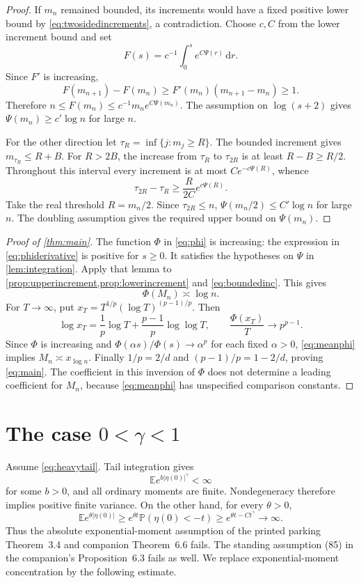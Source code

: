 \documentclass[11pt]{amsart}
\theoremstyle{remark}
\newcommand{\Pp}{\mathbb P}
\newcommand{\E}{\mathbb E}
\newcommand{\dd}{\,\mathrm d}
\begin{document}
\begin{proof}
If $m_n$ remained bounded, its increments would have a fixed positive
lower bound by \eqref{eq:twosidedincrements}, a contradiction.
Choose $c,C$ from the lower increment bound and set
\[
 F(s)=c^{-1}\int_0^s e^{C\Psi(r)}\dd r.
\]
Since $F'$ is increasing,
\[
 F(m_{n+1})-F(m_n)\ge F'(m_n)(m_{n+1}-m_n)\ge1.
\]
Therefore $n\le F(m_n)\le c^{-1}m_n e^{C\Psi(m_n)}$.
The assumption on $\log(s+2)$ gives
$\Psi(m_n)\ge c'\log n$ for large $n$.

For the other direction let $\tau_R=\inf\{j:m_j\ge R\}$.
The bounded increment gives $m_{\tau_R}\le R+B$.
For $R>2B$, the increase from $\tau_R$ to $\tau_{2R}$ is at least
$R-B\ge R/2$. Throughout this interval every increment is at most
$Ce^{-c\Psi(R)}$, whence
\[
 \tau_{2R}-\tau_R\ge\frac{R}{2C}e^{c\Psi(R)}.
\]
Take the real threshold $R=m_n/2$. Since $\tau_{2R}\le n$,
$\Psi(m_n/2)\le C'\log n$ for large $n$.
The doubling assumption gives the required upper bound on $\Psi(m_n)$.
\end{proof}

\begin{proof}[Proof of \cref{thm:main}]
The function $\Phi$ in \eqref{eq:phi} is increasing: the expression in
\eqref{eq:phiderivative} is positive for $s\ge0$.
It satisfies the hypotheses on $\Psi$ in \cref{lem:integration}.
Apply that lemma to \cref{prop:upperincrement,prop:lowerincrement} and
\eqref{eq:boundedinc}. This gives
\begin{equation}\label{eq:meanphi}
 \Phi(M_n)\asymp\log n.
\end{equation}
For $T\to\infty$, put
$x_T=T^{1/p}(\log T)^{(p-1)/p}$. Then
\[
 \log x_T=\frac1p\log T+\frac{p-1}{p}\log\log T,
 \qquad
 \frac{\Phi(x_T)}{T}\longrightarrow p^{p-1}.
\]
Since $\Phi$ is increasing and $\Phi(\alpha s)/\Phi(s)\to\alpha^p$
for each fixed $\alpha>0$, \eqref{eq:meanphi} implies
$M_n\asymp x_{\log n}$.
Finally $1/p=2/d$ and $(p-1)/p=1-2/d$, proving \eqref{eq:main}.
The coefficient in this inversion of $\Phi$ does not determine a
leading coefficient for $M_n$, because \eqref{eq:meanphi} has unspecified
comparison constants.
\end{proof}

\section{The case \texorpdfstring{$0<\gamma<1$}{0 < gamma < 1}}

Assume \eqref{eq:heavytail}. Tail integration gives
\begin{equation}\label{eq:stretchedmoment}
 \E e^{b|\eta(0)|^\gamma}<\infty
\end{equation}
for some $b>0$, and all ordinary moments are finite. Nondegeneracy
therefore implies positive finite variance. On the other hand, for every
$\theta>0$,
\[
 \E e^{\theta|\eta(0)|}
 \ge e^{\theta t}\Pp(\eta(0)<-t)
 \ge e^{\theta t-Ct^\gamma}\longrightarrow\infty.
\]
Thus the absolute exponential-moment assumption of the printed parking
Theorem~3.4 and companion Theorem~6.6 fails. The standing assumption
(85) in the companion's Proposition~6.3 fails as well.
We replace exponential-moment concentration by the following estimate.
\end{document}
